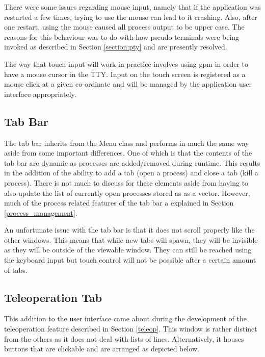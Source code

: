 There were some issues regarding mouse input, namely that if the application was restarted a few times, trying to use the mouse can lead to it crashing. Also, after one restart, using the mouse caused all process output to be upper case. The reasons for this behaviour was to do with how pseudo-terminals were being invoked as described in Section \ref{section:pty} and are presently resolved.

The way that touch input will work in practice involves using {\selectfont gpm} in order to have a mouse cursor in the {\selectfont TTY}. Input on the touch screen is registered as a mouse click at a given co-ordinate and will be managed by the application user interface appropriately.

\subsection{Tab Bar}

The tab bar inherits from the Menu class and performs in much the same way aside from some important differences. One of which is that the contents of the tab bar are dynamic as processes are added/removed during runtime. This results in the addition of the ability to add a tab (open a process) and close a tab (kill a process). There is not much to discuss for these elements aside from having to also update the list of currently open processes stored as as a vector. However, much of the process related features of the tab bar a explained in Section \ref{process_management}.

An unfortunate issue with the tab bar is that it does not scroll properly like the other windows. This means that while new tabs will spawn, they will be invisible as they will be outside of the viewable window. They can still be reached using the keyboard input but touch control will not be possible after a certain amount of tabs.

\subsection{Teleoperation Tab}

This addition to the user interface came about during the development of the teleoperation feature described in Section \ref{teleop}. This window is rather distinct from the others as it does not deal with lists of lines. Alternatively, it houses buttons that are clickable and are arranged as depicted below.


